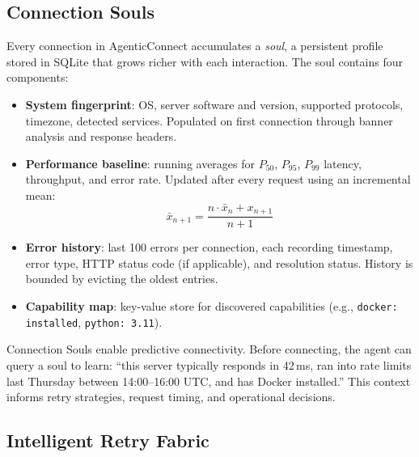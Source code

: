 \documentclass[10pt, twocolumn]{article}
\begin{document}
\subsection{Connection Souls}
\label{sec:souls}

Every connection in AgenticConnect accumulates a \emph{soul}, a persistent profile stored in SQLite that grows richer with each interaction. The soul contains four components:

\begin{itemize}[nosep, leftmargin=*]
  \item \textbf{System fingerprint}: OS, server software and version, supported protocols, timezone, detected services. Populated on first connection through banner analysis and response headers.
  \item \textbf{Performance baseline}: running averages for $P_{50}$, $P_{95}$, $P_{99}$ latency, throughput, and error rate. Updated after every request using an incremental mean:
  \begin{equation}
    \bar{x}_{n+1} = \frac{n \cdot \bar{x}_n + x_{n+1}}{n+1}
    \label{eq:mean}
  \end{equation}
  \item \textbf{Error history}: last 100 errors per connection, each recording timestamp, error type, HTTP status code (if applicable), and resolution status. History is bounded by evicting the oldest entries.
  \item \textbf{Capability map}: key-value store for discovered capabilities (e.g., \texttt{docker: installed}, \texttt{python: 3.11}).
\end{itemize}

Connection Souls enable predictive connectivity. Before connecting, the agent can query a soul to learn: ``this server typically responds in 42\,ms, ran into rate limits last Thursday between 14:00--16:00 UTC, and has Docker installed.'' This context informs retry strategies, request timing, and operational decisions.

\subsection{Intelligent Retry Fabric}
\label{sec:retry}
\end{document}
